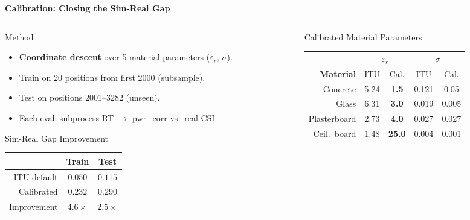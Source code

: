 \documentclass[
    aspectratio=169
]{beamer}
\begin{document}
\begin{frame}{\textbf{Calibration: Closing the Sim-Real Gap}}
\vspace{-0.2cm}
\begin{columns}[T]
\begin{column}{0.48\textwidth}
\begin{block}{Method}
\footnotesize
\begin{itemize}
    \item \textbf{Coordinate descent} over 5 material parameters ($\varepsilon_r$, $\sigma$).
    \item Train on 20 positions from first 2000 (subsample).
    \item Test on positions 2001--3282 (unseen).
    \item Each eval: subprocess RT $\to$ pwr\_corr vs.\ real CSI.
\end{itemize}
\end{block}
\vspace{0.1cm}
\begin{block}{Sim-Real Gap Improvement}
\footnotesize
\begin{tabular}{rcc}
\toprule
& \textbf{Train} & \textbf{Test} \\
\midrule
ITU default & $0.050$ & $0.115$ \\
\rowcolor{green!15} Calibrated & $0.232$ & $\mathbf{0.290}$ \\
\midrule
Improvement & $4.6\times$ & $2.5\times$ \\
\bottomrule
\end{tabular}
\end{block}
\end{column}
\begin{column}{0.48\textwidth}
\vspace{0.1cm}
\footnotesize
\begin{block}{Calibrated Material Parameters}
\scriptsize
\begin{tabular}{rcccc}
\toprule
& \multicolumn{2}{c}{$\varepsilon_r$} & \multicolumn{2}{c}{$\sigma$} \\
\cmidrule(lr){2-3}\cmidrule(lr){4-5}
\textbf{Material} & ITU & Cal. & ITU & Cal. \\
\midrule
Concrete & 5.24 & \textbf{1.5} & 0.121 & 0.05 \\
Glass & 6.31 & \textbf{3.0} & 0.019 & 0.005 \\
Plasterboard & 2.73 & \textbf{4.0} & 0.027 & 0.027 \\
Ceil.\ board & 1.48 & \textbf{25.0} & 0.004 & 0.001 \\

\end{tabular}
\end{block}
\end{column}
\end{columns}
\end{frame}
\end{document}

